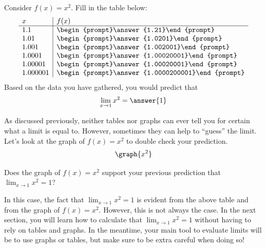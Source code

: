 \documentclass[handout]{ximera}
\begin{document}
\begin{exercise}
Consider $f(x) = x^2$. Fill in the 
  table below:
  \[
  \begin{array}{l|l}
    x      & f(x)      \\ \hline
    1.1    & \begin{prompt}\answer{1.21}\end{prompt}\\
    1.01   & \begin{prompt}\answer{1.0201}\end{prompt}\\
    1.001  & \begin{prompt}\answer{1.002001}\end{prompt}\\
    1.0001 & \begin{prompt}\answer{1.00020001}\end{prompt}\\
    1.00001 & \begin{prompt}\answer{1.00020001}\end{prompt}\\
    1.000001 & \begin{prompt}\answer{1.0000200001}\end{prompt}
  \end{array}
  \]
  Based on the data you have gathered, you would predict that 
  \[
  \lim_{x\to 1} x^2 = \answer{1}
  \]
  
    \begin{exercise}
    As discussed previously, neither tables nor graphs can ever tell you for certain what a limit is equal to. However, sometimes they can help to ``guess'' the limit. Let's look at the graph of $f(x) = x^2$ to double check your prediction. 
\[
\graph{x^2}
\]

Does the graph of $f(x) = x^2$ support your previous prediction that $\lim_{x\to 1} x^2 = 1$? 

\begin{multipleChoice}
    
\begin{feedback}[correct]

In this case, the fact that $\lim_{x\to 1} x^2 = 1$ is evident from the above table and from the graph of $f(x) = x^2$.  However, this is not always the case.  In the next section, you will learn how to calculate that $\lim_{x\to 1} x^2 = 1$ without having to rely on tables and graphs.  In the meantime, your main tool to evaluate limits will be to use graphs or tables, but make sure to be extra careful when doing so! 

\end{feedback}
\end{multipleChoice}
    \end{exercise}

\end{exercise}
\end{document}
